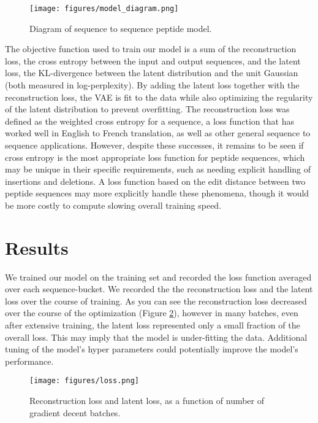\documentclass[final,1p,times]{elsarticle}
\begin{document}
\begin{figure}[h]
  \centering
  \texttt{[image: figures/model\_diagram.png]}
  \caption{Diagram of sequence to sequence peptide model.}
  \label{model_diagram}
\end{figure}

The objective function used to train our model is a sum of the reconstruction loss, the cross entropy between the input and output sequences, and the latent loss, the KL-divergence between the latent distribution and the unit Gaussian (both measured in log-perplexity). By adding the latent loss together with the reconstruction loss, the VAE is fit to the data while also optimizing the regularity of the latent distribution to prevent overfitting. The reconstruction loss was defined as the weighted cross entropy for a sequence, a loss function that has worked well in English to French translation, as well as other general sequence to sequence applications\cite{vinyals2015grammar}. However, despite these successes, it remains to be seen if cross entropy is the most appropriate loss function for peptide sequences, which may be unique in their specific requirements, such as needing explicit handling of insertions and deletions. A loss function based on the edit distance between two peptide sequences may more explicitly handle these phenomena, though it would be more costly to compute slowing overall training speed.

\section{Results}

We trained our model on the training set and recorded the loss function averaged over each sequence-bucket. We recorded the the reconstruction loss and the latent loss over the course of training. As you can see the reconstruction loss decreased over the course of the optimization (Figure \ref{loss}), however in many batches, even after extensive training, the latent loss represented only a small fraction of the overall loss. This may imply that the model is under-fitting the data. Additional tuning of the model's hyper parameters could potentially improve the model's performance.

\begin{figure}[h]
  \centering
  \texttt{[image: figures/loss.png]}
  \caption{Reconstruction loss and latent loss, as a function of number of gradient decent batches.}
  \label{loss}
\end{figure}
\end{document}
